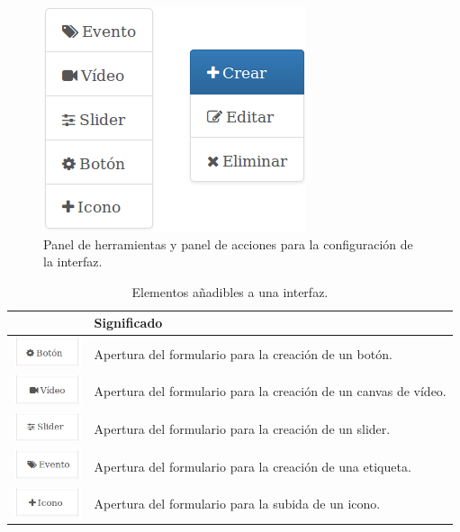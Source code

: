 \begin{figure}[H]
  \begin{center}
    \includegraphics[scale=.6]{imagenes/manual-usuario/barra-herramientas-interfaz.png}
  \end{center}
  \caption{Panel de herramientas  y panel de acciones para la configuración de la interfaz.}
  \label{website:pagina-principal}
\end{figure}


\begin{table}[H]
  \begin{center}
    \begin{tabular}{|p{2cm}|p{10cm}|}
      \hline
      \centering{Botón} & \qquad \quad Significado \\
      \hline
      \includegraphics[width=2cm]{imagenes/manual-usuario/nuevo-boton.png} & Apertura del formulario para la creación de un botón. \\
      \hline
      \includegraphics[width=2cm]{imagenes/manual-usuario/nuevo-video.png} & Apertura del formulario para la creación de un canvas de vídeo. \\
      \hline
      \includegraphics[width=2cm]{imagenes/manual-usuario/nuevo-slider.png} & Apertura del formulario para la creación de un slider. \\
      \hline
      \includegraphics[width=2cm]{imagenes/manual-usuario/nuevo-evento.png} & Apertura del formulario para la creación de una etiqueta. \\
      \hline
      \includegraphics[width=2cm]{imagenes/manual-usuario/nuevo-icono.png} & Apertura del formulario para la subida de un icono. \\
      \hline
    \end{tabular}
  \end{center}
\caption{Elementos añadibles a una interfaz.}
\end{table}

